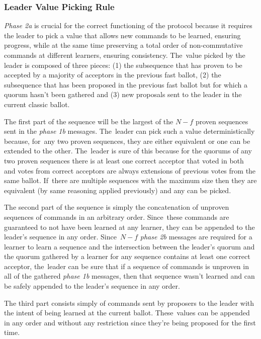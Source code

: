 \documentclass[algorithms,article,accept,moreauthors,pdftex,10pt,a4paper]{Definitions/mdpi}
\begin{document}
\subsubsection{Leader Value Picking Rule} \textit{Phase 2a} is crucial for the correct functioning of the protocol because it requires the leader to pick a value that allows new commands to be learned, ensuring progress, while at the same time preserving a total order of non-commutative commands at different learners, ensuring consistency. The~value picked by the leader is composed of three pieces: (1) the subsequence that has proven to be accepted by a majority of acceptors in the previous fast ballot, (2) the subsequence that has been proposed in the previous fast ballot but for which a quorum hasn't been gathered and (3) new proposals sent to the leader in the current classic ballot. \par
The first part of the sequence will be the largest of the $N-f$ proven sequences sent in the \textit{phase 1b} messages. The~leader can pick such a value deterministically because, for~any two proven sequences, they are either equivalent or one can be extended to the other. The~leader is sure of this because for the quorums of any two proven sequences there is at least one correct acceptor that voted in both and votes from correct acceptors are always extensions of previous votes from the same ballot. If~there are multiple sequences with the maximum size then they are equivalent (by same reasoning applied previously) and any can be picked. \par
The second part of the sequence is simply the concatenation of unproven sequences of commands in an arbitrary order. Since~these commands are guaranteed to not have been learned at any learner, they can be appended to the leader's sequence in any order. Since~$N-f$ \textit{phase 2b} messages are required for a learner to learn a sequence and the intersection between the leader's quorum and the quorum gathered by a learner for any sequence contains at least one correct acceptor, the~leader can be sure that if a sequence of commands is unproven in all of the gathered \textit{phase 1b} messages, then that sequence wasn't learned and can be safely appended to the leader's sequence in any order. \par 
The third part consists simply of commands sent by proposers to the leader with the intent of being learned at the current ballot. These~values can be appended in any order and without any restriction since they're being proposed for the first time.
\end{document}
